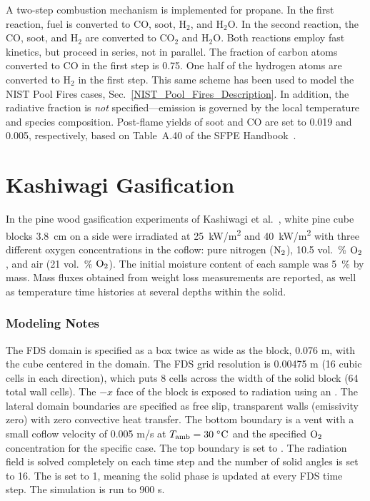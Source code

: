 A two-step combustion mechanism is implemented for propane. In the first reaction, fuel is converted to CO, soot, H$_2$, and H$_2$O. In the second reaction, the CO, soot, and H$_2$ are converted to CO$_2$ and H$_2$O. Both reactions employ fast kinetics, but proceed in series, not in parallel. The fraction of carbon atoms converted to CO in the first step is 0.75. One half of the hydrogen atoms are converted to H$_2$ in the first step. This same scheme has been used to model the NIST Pool Fires cases, Sec.~\ref{NIST_Pool_Fires_Description}. In addition, the radiative fraction is {\em not} specified---emission is governed by the local temperature and species composition. Post-flame yields of soot and CO are set to 0.019 and 0.005, respectively, based on Table~A.40 of the SFPE Handbook~\cite{SFPE}.


\section{Kashiwagi Gasification}
\label{Kashiwagi_Gasification_Description}

In the pine wood gasification experiments of Kashiwagi et al.~\cite{Kashiwagi:1987}, white pine cube blocks 3.8~cm on a side were irradiated at 25~\unit{kW/m^2} and 40~\unit{kW/m^2} with three different oxygen concentrations in the coflow: pure nitrogen (${\rm N}_2$), 10.5 vol.~\% ${\rm O}_2$, and air (21 vol.~\% ${\rm O}_2$).  The initial moisture content of each sample was 5~\% by mass. Mass fluxes obtained from weight loss measurements are reported, as well as temperature time histories at several depths within the solid.

\subsubsection{Modeling Notes}

The FDS domain is specified as a box twice as wide as the block, 0.076 m, with the cube centered in the domain.  The FDS grid resolution is 0.00475 m (16 cubic cells in each direction), which puts 8 cells across the width of the solid block (64 total wall cells).  The $-x$ face of the block is exposed to radiation using an .  The lateral domain boundaries are specified as free slip, transparent walls (emissivity zero) with zero convective heat transfer.  The bottom boundary is a vent with a small coflow velocity of 0.005 m/s at $T_{\rm amb} = 30\;\unit{\degreeCelsius}$ and the specified ${\rm O}_2$ concentration for the specific case.  The top boundary is set to .  The radiation field is solved completely on each time step and the number of solid angles is set to 16.  The  is set to 1, meaning the solid phase is updated at every FDS time step.  The simulation is run to 900 s.

